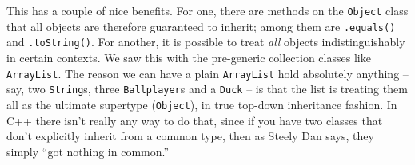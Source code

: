 This has a couple of nice benefits. For one, there are methods on the
\texttt{Object} class that all objects are therefore guaranteed to inherit;
among them are \texttt{.equals()} and \texttt{.toString()}. For another, it is
possible to treat \textit{all} objects indistinguishably in certain contexts.
We saw this with the pre-generic collection classes like \texttt{ArrayList}.
The reason we can have a plain \texttt{ArrayList} hold absolutely anything --
say, two \texttt{String}s, three \texttt{Ballplayer}s and a \texttt{Duck} --
is that the list is treating them all as the ultimate supertype
(\texttt{Object}), in true top-down inheritance fashion. In C++ there isn't
really any way to do that, since if you have two classes that don't explicitly
inherit from a common type, then as Steely Dan says, they simply ``got nothing
in common.''

